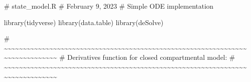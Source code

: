 \documentclass[
  11pt,
  letterpaper,
  DIV=11,
  numbers=noendperiod]{scrartcl}
\newenvironment{Shaded}{\begin{snugshade}}{\end{snugshade}}
\newcommand{\CommentTok}[1]{\textcolor[rgb]{0.37,0.37,0.37}{#1}}
\newcommand{\FunctionTok}[1]{\textcolor[rgb]{0.28,0.35,0.67}{#1}}
\newcommand{\NormalTok}[1]{\textcolor[rgb]{0.00,0.23,0.31}{#1}}
\begin{document}
\begin{Shaded}
\begin{Highlighting}[]
\CommentTok{\# state\_model.R}
\CommentTok{\# February 9, 2023}
\CommentTok{\# Simple ODE implementation}

\FunctionTok{library}\NormalTok{(tidyverse)}
\FunctionTok{library}\NormalTok{(data.table)}
\FunctionTok{library}\NormalTok{(deSolve)}

\CommentTok{\# \textasciitilde{}\textasciitilde{}\textasciitilde{}\textasciitilde{}\textasciitilde{}\textasciitilde{}\textasciitilde{}\textasciitilde{}\textasciitilde{}\textasciitilde{}\textasciitilde{}\textasciitilde{}\textasciitilde{}\textasciitilde{}\textasciitilde{}\textasciitilde{}\textasciitilde{}\textasciitilde{}\textasciitilde{}\textasciitilde{}\textasciitilde{}\textasciitilde{}\textasciitilde{}\textasciitilde{}\textasciitilde{}\textasciitilde{}\textasciitilde{}\textasciitilde{}\textasciitilde{}\textasciitilde{}\textasciitilde{}\textasciitilde{}\textasciitilde{}\textasciitilde{}\textasciitilde{}\textasciitilde{}\textasciitilde{}\textasciitilde{}\textasciitilde{}\textasciitilde{}\textasciitilde{}\textasciitilde{}\textasciitilde{}\textasciitilde{}\textasciitilde{}\textasciitilde{}\textasciitilde{}\textasciitilde{}\textasciitilde{}\textasciitilde{}\textasciitilde{}\textasciitilde{}\textasciitilde{}\textasciitilde{}\textasciitilde{}\textasciitilde{}\textasciitilde{}\textasciitilde{}\textasciitilde{}\textasciitilde{}\textasciitilde{}\textasciitilde{}\textasciitilde{}\textasciitilde{}\textasciitilde{}\textasciitilde{}\textasciitilde{}\textasciitilde{}\textasciitilde{}\textasciitilde{}\textasciitilde{}\textasciitilde{}\textasciitilde{}\textasciitilde{}\textasciitilde{}\textasciitilde{}\textasciitilde{}\textasciitilde{}}
\CommentTok{\# Derivatives function for closed compartmental model:}
\CommentTok{\# \textasciitilde{}\textasciitilde{}\textasciitilde{}\textasciitilde{}\textasciitilde{}\textasciitilde{}\textasciitilde{}\textasciitilde{}\textasciitilde{}\textasciitilde{}\textasciitilde{}\textasciitilde{}\textasciitilde{}\textasciitilde{}\textasciitilde{}\textasciitilde{}\textasciitilde{}\textasciitilde{}\textasciitilde{}\textasciitilde{}\textasciitilde{}\textasciitilde{}\textasciitilde{}\textasciitilde{}\textasciitilde{}\textasciitilde{}\textasciitilde{}\textasciitilde{}\textasciitilde{}\textasciitilde{}\textasciitilde{}\textasciitilde{}\textasciitilde{}\textasciitilde{}\textasciitilde{}\textasciitilde{}\textasciitilde{}\textasciitilde{}\textasciitilde{}\textasciitilde{}\textasciitilde{}\textasciitilde{}\textasciitilde{}\textasciitilde{}\textasciitilde{}\textasciitilde{}\textasciitilde{}\textasciitilde{}\textasciitilde{}\textasciitilde{}\textasciitilde{}\textasciitilde{}\textasciitilde{}\textasciitilde{}\textasciitilde{}\textasciitilde{}\textasciitilde{}\textasciitilde{}\textasciitilde{}\textasciitilde{}\textasciitilde{}\textasciitilde{}\textasciitilde{}\textasciitilde{}\textasciitilde{}\textasciitilde{}\textasciitilde{}\textasciitilde{}\textasciitilde{}\textasciitilde{}\textasciitilde{}\textasciitilde{}\textasciitilde{}\textasciitilde{}\textasciitilde{}\textasciitilde{}\textasciitilde{}\textasciitilde{}}

\end{Highlighting}
\end{Shaded}
\end{document}
